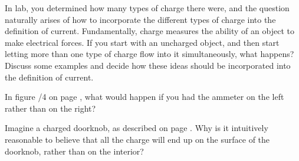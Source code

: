 \dqheader
\begin{dq}\label{dq:signsofcurrent}
In lab, you determined how many types of charge there were, and the
question naturally arises of how to incorporate the different types
of charge into the definition of current.
Fundamentally, charge measures the ability of an object to make
electrical forces. If you start with an uncharged object, and then
start letting more than one type of charge flow into it simultaneously,
what happens? Discuss some examples and decide how these ideas should
be incorporated into the definition of current.
\end{dq}
\begin{dq}
In figure /4 on page \pageref{fig:basiccircuits}, what would happen if you had
the ammeter on the left rather than on the right?
\end{dq}
\begin{dq}\label{dq:chargeonsurface}
Imagine a charged doorknob, as described on page \pageref{text:chargeonsurface}.
Why is it intuitively reasonable to believe that all the charge will end up on the surface
of the doorknob, rather than on the interior?
\end{dq}


